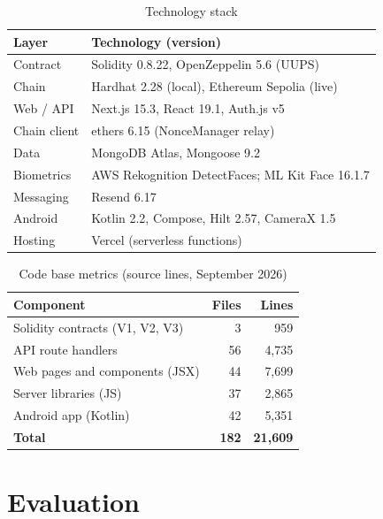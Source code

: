 \documentclass[conference]{IEEEtran}
\begin{document}
\begin{table}[t]
\caption{Technology stack}
\label{tab:stack}
\centering
\footnotesize
\begin{tabular}{@{}ll@{}}
\toprule
\textbf{Layer} & \textbf{Technology (version)} \\
\midrule
Contract & Solidity 0.8.22, OpenZeppelin 5.6 (UUPS) \\
Chain & Hardhat 2.28 (local), Ethereum Sepolia (live) \\
Web / API & Next.js 15.3, React 19.1, Auth.js v5 \\
Chain client & ethers 6.15 (NonceManager relay) \\
Data & MongoDB Atlas, Mongoose 9.2 \\
Biometrics & AWS Rekognition DetectFaces; ML Kit Face 16.1.7 \\
Messaging & Resend 6.17 \\
Android & Kotlin 2.2, Compose, Hilt 2.57, CameraX 1.5 \\
Hosting & Vercel (serverless functions) \\
\bottomrule
\end{tabular}
\end{table}

\begin{table}[t]
\caption{Code base metrics (source lines, September 2026)}
\label{tab:loc}
\centering
\footnotesize
\begin{tabular}{@{}lrr@{}}
\toprule
\textbf{Component} & \textbf{Files} & \textbf{Lines} \\
\midrule
Solidity contracts (V1, V2, V3) & 3 & 959 \\
API route handlers & 56 & 4,735 \\
Web pages and components (JSX) & 44 & 7,699 \\
Server libraries (JS) & 37 & 2,865 \\
Android app (Kotlin) & 42 & 5,351 \\
\midrule
\textbf{Total} & \textbf{182} & \textbf{21,609} \\
\bottomrule
\end{tabular}
\end{table}

\section{Evaluation}
\label{sec:eval}
\end{document}

